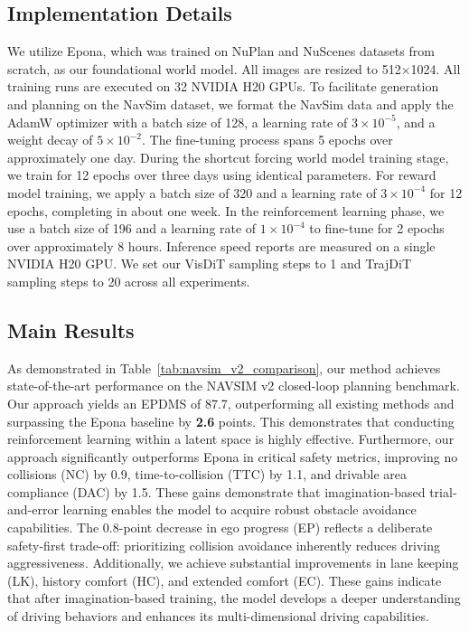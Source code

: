 \documentclass[runningheads]{llncs}
\begin{document}
\subsection{Implementation Details}
We utilize Epona, which was trained on NuPlan and NuScenes datasets from scratch, as our foundational world model. All images are resized to 512×1024. All training runs are executed on 32 NVIDIA H20 GPUs. 
To facilitate generation and planning on the NavSim dataset, we format the NavSim data and apply the AdamW optimizer with a batch size of 128, a learning rate of $3 \times 10^{-5}$, and a weight decay of $5 \times 10^{-2}$. 
The fine-tuning process spans 5 epochs over approximately one day. 
During the shortcut forcing world model training stage, we train for 12 epochs over three days using identical parameters. 
For reward model training, we apply a batch size of 320 and a learning rate of $3 \times 10^{-4}$ for 12 epochs, completing in about one week. 
In the reinforcement learning phase, we use a batch size of 196 and a learning rate of $1 \times 10^{-4}$ to fine-tune for 2 epochs over approximately 8 hours. 
Inference speed reports are measured on a single NVIDIA H20 GPU. 
We set our VisDiT sampling steps to 1 and TrajDiT sampling steps to 20 across all experiments.

\subsection{Main Results}
As demonstrated in Table~\ref{tab:navsim_v2_comparison}, our method achieves state-of-the-art performance on the NAVSIM v2 closed-loop planning benchmark. Our approach yields an EPDMS of 87.7, outperforming all existing methods and surpassing the Epona baseline by \textbf{2.6} points. This demonstrates that conducting reinforcement learning within a latent space is highly effective. Furthermore, our approach significantly outperforms Epona in critical safety metrics, improving no collisions (NC) by 0.9, time-to-collision (TTC) by 1.1, and drivable area compliance (DAC) by 1.5. These gains demonstrate that imagination-based trial-and-error learning enables the model to acquire robust obstacle avoidance capabilities. The 0.8-point decrease in ego progress (EP) reflects a deliberate safety-first trade-off: prioritizing collision avoidance inherently reduces driving aggressiveness. Additionally, we achieve substantial improvements in lane keeping (LK), history comfort (HC), and extended comfort (EC). These gains indicate that after imagination-based training, the model develops a deeper understanding of driving behaviors and enhances its multi-dimensional driving capabilities.
\end{document}
